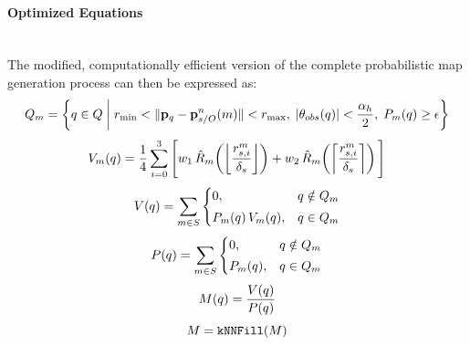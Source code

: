 \paragraph{Optimized Equations} \mbox{}\\[0.5em] \noindent
The modified, computationally efficient version of the complete probabilistic map generation process can then be expressed as:
\begin{equation}
    Q_m = \left\{
        q \in Q \; \bigg| \;
        r_{\min} < \| \mathbf{p}_q - \mathbf{p}_{s/O}^{n}(m) \| < r_{\max},
        \;
        |\theta_{obs}(q)| < \frac{\alpha_h}{2},
        \;
        P_m(q) \geq \epsilon
    \right\}
    \label{eq:local-map-generation-multistage-pruning-fast} \\[0.5em]
\end{equation}
\begin{equation}
    V_m(q) = \frac{1}{4} \sum_{i=0}^{3} 
        \Bigg[
        w_1 \, \hat{R}_m\!\left(
            \left\lfloor \frac{r_{s,i}^m}{\delta_s} \right\rfloor
        \right)
        +
        w_2 \, \hat{R}_m\!\left(
            \left\lceil \frac{r_{s,i}^m}{\delta_s} \right\rceil
        \right)
    \Bigg]
    \label{eq:local-map-generation-interpolation-fast} \\[0.5em]
\end{equation}
\begin{equation}
    V(q) = 
    \sum_{m \in S}
    \begin{cases}
        0, & q \notin Q_m \\[0.25em]
        P_m(q) \, V_m(q), & q \in Q_m
    \end{cases}
    \label{eq:local-map-generation-reflectivity-fusion-fast} \\[0.5em]
\end{equation}
\begin{equation}
    P(q) = 
    \sum_{m \in S}
    \begin{cases}
        0, & q \notin Q_m \\[0.25em]
        P_m(q), & q \in Q_m
    \end{cases}
    \label{eq:local-map-generation-probability-sum-fast} \\[0.5em]
\end{equation}
\begin{equation}
    M(q) = \frac{V(q)}{P(q)}
    \label{eq:local-map-generation-final-map-fast} \\[0.5em]
\end{equation}
\begin{equation}
    M = \texttt{kNNFill}(M)
    \label{eq:local-map-generation-final-map-filled-inn-fast} \\[0.5em]
\end{equation}

